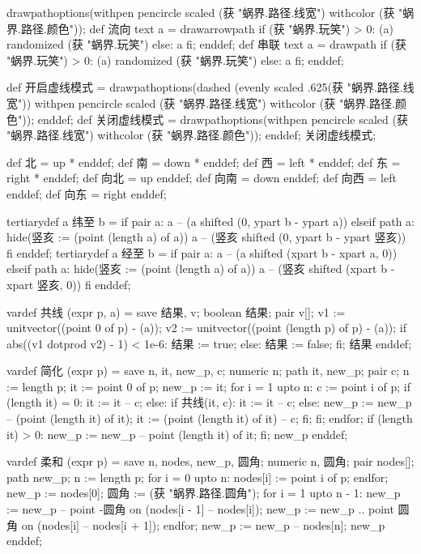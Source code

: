 \startMPinclusions[+]
drawpathoptions(withpen pencircle scaled (获 "蜗界.路径.线宽") withcolor (获 "蜗界.路径.颜色"));
def 流向 text a =
  drawarrowpath if (获 "蜗界.玩笑") > 0: (a) randomized (获 "蜗界.玩笑") else: a fi;
enddef;
def 串联 text a =
  drawpath if (获 "蜗界.玩笑") > 0: (a) randomized (获 "蜗界.玩笑") else: a fi;  
enddef;
\stopMPinclusions

\startMPinclusions[+]
def 开启虚线模式 =
  drawpathoptions(dashed (evenly scaled .625(获 "蜗界.路径.线宽"))
                  withpen pencircle scaled (获 "蜗界.路径.线宽")
                  withcolor (获 "蜗界.路径.颜色"));
enddef;
def 关闭虚线模式 =
  drawpathoptions(withpen pencircle scaled (获 "蜗界.路径.线宽")
                  withcolor (获 "蜗界.路径.颜色"));
enddef;
关闭虚线模式;
\stopMPinclusions

\startMPinclusions[+]
def 北 = up * enddef; 
def 南 = down * enddef;
def 西 = left * enddef; 
def 东 = right * enddef;
def 向北 = up enddef; 
def 向南 = down enddef;
def 向西 = left enddef; 
def 向东 = right enddef;

tertiarydef a 纬至 b = 
  if pair a:
    a -- (a shifted (0, ypart b - ypart a))
  elseif path a:
    hide(竖亥 := (point (length a) of a))
    a -- (竖亥 shifted (0, ypart b - ypart 竖亥))
  fi
enddef;
tertiarydef a 经至 b = 
  if pair a:
    a -- (a shifted (xpart b - xpart a, 0))
  elseif path a:
    hide(竖亥 := (point (length a) of a))
    a -- (竖亥 shifted (xpart b - xpart 竖亥, 0))
  fi
enddef;
\stopMPinclusions

\startMPinclusions[+]
vardef 共线 (expr p, a) =
  save 结果, v; boolean 结果; pair v[];
  v1 := unitvector((point 0 of p) - (a));
  v2 := unitvector((point (length p) of p) - (a));
  if abs((v1 dotprod v2) - 1) < 1e-6:
     结果 := true;
  else:
    结果 := false;
  fi;
  结果
enddef;

vardef 简化 (expr p) =
  save n, it, new_p, c;
  numeric n; path it, new_p; pair c;
  n := length p;
  it := point 0 of p;
  new_p := it;
  for i = 1 upto n:
    c := point i of p;
    if (length it) = 0: 
      it := it -- c;
    else:
      if 共线(it, c):
        it := it -- c;
      else:
        new_p := new_p -- (point (length it) of it);
        it := (point (length it) of it) -- c;
      fi;
    fi;
  endfor;
  if (length it) > 0:
    new_p := new_p -- point (length it) of it;
  fi;
  new_p
enddef;

vardef 柔和 (expr p) =
  save n, nodes, new_p, 圆角; 
  numeric n, 圆角; pair nodes[]; path new_p;
  n := length p;
  for i = 0 upto n:
    nodes[i] := point i of p;
  endfor;
  new_p := nodes[0];
  圆角 := (获 "蜗界.路径.圆角");
  for i = 1 upto n - 1:
    new_p := new_p -- point -圆角 on (nodes[i - 1] -- nodes[i]);
    new_p := new_p .. point 圆角 on (nodes[i] -- nodes[i + 1]);
  endfor;
  new_p := new_p -- nodes[n];
  new_p
enddef;
\stopMPinclusions

